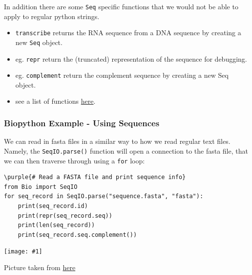 \documentclass[xcolor=svgnames]{beamer}
\newcommand{\purple}[1]{{\textcolor{purple}{#1}}}
\newcommand{\nl}{\\[1em]}
\newcommand{\ipic}[2]{\texttt{[image: \#1]}}
\newcommand{\ft}[1]{\frametitle{#1}}
\begin{document}
\begin{frame}
In addition there are some {\tt Seq} specific functions that we would not be able to apply to regular python strings. 
\begin{itemize}
\item  	
{\tt transcribe}
returns the RNA sequence from a DNA sequence by creating a new {\tt Seq} object.
\item eg. {\tt repr} return the (truncated) representation of the sequence for debugging.
\item eg. {\tt complement} return the complement sequence by creating a new Seq object.
\item see a list of functions \href{https://biopython.org/DIST/docs/api/Bio.Seq.Seq-class.html}{here}.
\end{itemize}

\end{frame}




\begin{frame}[fragile]\ft{Biopython Example - Using Sequences}
We can read in fasta files in a similar way to how we read regular text files.\nl
Namely, the {\tt SeqIO.parse()} function will open a connection to the fasta file, that we can then traverse through using a {\tt for} loop:
\begin{Verbatim}[commandchars=\\\{\}]
\purple{# Read a FASTA file and print sequence info}
from Bio import SeqIO
for seq_record in SeqIO.parse("sequence.fasta", "fasta"):
    print(seq_record.id)
    print(repr(seq_record.seq))
    print(len(seq_record))
    print(seq_record.seq.complement())
\end{Verbatim}
\end{frame}



\begin{frame}
\ipic{img/dna}{0.9}

Picture taken from \href{https://www.khanacademy.org/science/biology/gene-expression-central-dogma/transcription-of-dna-into-rna/a/overview-of-transcription}{here}
\end{frame}
\end{document}
